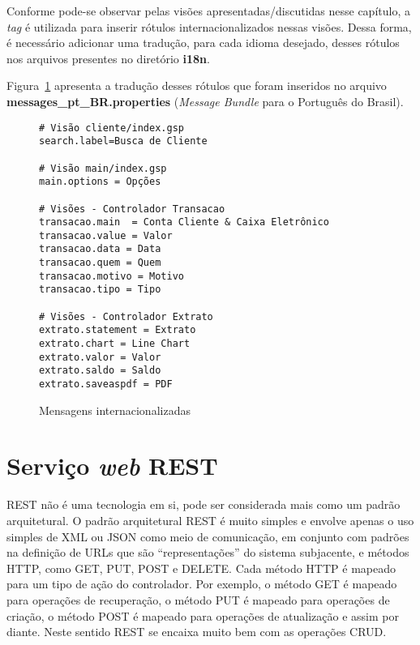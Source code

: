 Conforme pode-se observar pelas visões apresentadas/discutidas nesse capítulo, a
{\it tag} {\bf <g:message>} é utilizada para inserir rótulos internacionalizados
nessas  visões.  Dessa  forma, é  necessário adicionar  uma tradução,  para cada
idioma desejado, desses rótulos nos arquivos presentes no diretório {\bf i18n}. 

\vspace{0.2cm}

\noindent  Figura~\ref{figI18n} apresenta  a tradução  desses rótulos  que foram
inseridos  no arquivo  {\bf messages\_pt\_BR.properties}  ({\it  Message Bundle}
para o Português do Brasil).  

\vspace{0.3cm}

\begin{figure}[htbp]
\begin{mdframed}
\begin{footnotesize}
\begin{verbatim}
# Visão cliente/index.gsp
search.label=Busca de Cliente

# Visão main/index.gsp
main.options = Opções

# Visões - Controlador Transacao
transacao.main  = Conta Cliente & Caixa Eletrônico
transacao.value = Valor
transacao.data = Data
transacao.quem = Quem
transacao.motivo = Motivo
transacao.tipo = Tipo

# Visões - Controlador Extrato
extrato.statement = Extrato
extrato.chart = Line Chart
extrato.valor = Valor
extrato.saldo = Saldo
extrato.saveaspdf = PDF
\end{verbatim}
\end{footnotesize}
\end{mdframed}
\caption{Mensagens internacionalizadas}
\label{figI18n}
\end{figure}

\newpage

\section{Serviço {\it web} REST}\label{secWebREST}

\vspace{0.5cm}

REST  não é  uma tecnologia  em si,  pode ser  considerada mais  como  um padrão
arquitetural. O padrão arquitetural REST é  muito simples e envolve apenas o uso
simples de  XML ou  JSON como meio  de comunicação,  em conjunto com  padrões na
definição de  URLs que são  ``representações'' do sistema subjacente,  e métodos
HTTP, como GET, PUT,  POST e DELETE. Cada método HTTP é  mapeado para um tipo de
ação  do controlador.  Por exemplo,  o método  GET é  mapeado para  operações de
recuperação, o método  PUT é mapeado para operações de criação,  o método POST é
mapeado para operações de atualização e  assim por diante. Neste sentido REST se
encaixa muito bem com as operações CRUD. 

